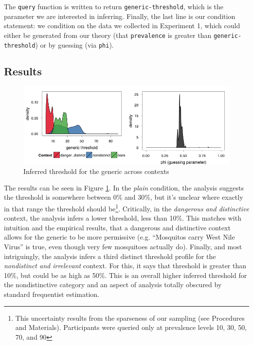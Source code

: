 \documentclass[10pt,letterpaper]{article}
\begin{document}
The \lstinline{query} function is written to return \lstinline{generic-threshold}, which is the parameter we are interested in inferring. Finally, the last line is our condition statement: we condition on the data we collected in Experiment 1, which could either be generated from our theory (that \lstinline{prevalence} is greater than \lstinline{generic-threshold}) or by guessing (via \lstinline{phi}). 

\subsection{Results}
\begin{figure}
\centering
    \includegraphics[width=\columnwidth]{fig2_bda1_combined}
    \caption{Inferred threshold for the generic across contexts}
  \label{fig:bda1a}
\end{figure}

The results can be seen in Figure \ref{fig:bda1a}. In the \emph{plain} condition, the analysis suggests the threshold is somewhere between 0\% and 30\%, but it's unclear where exactly in that range the threshold should be\footnote{This uncertainty results from the sparseness of our sampling (see Procedures and Materials). Participants were queried only at prevalence levels 10, 30, 50, 70, and 90}. Critically, in the \emph{dangerous and distinctive} context, the analysis infers a lower threshold, less than 10\%. This matches with intuition and the empirical results, that a dangerous and distinctive context allows for the generic to be more permissive (e.g. ``Mosquitos carry West Nile Virus'' is true, even though very few mosquitoes actually do). Finally, and most intriguingly, the analysis infers a third distinct threshold profile for the \emph{nondistinct and irrelevant} context.  For this, it says that threshold is greater than 10\%, but could be as high as 50\%. This is an overall higher inferred threshold for the nondistinctive category and an aspect of analysis totally obscured by standard frequentist estimation. 
\end{document}
